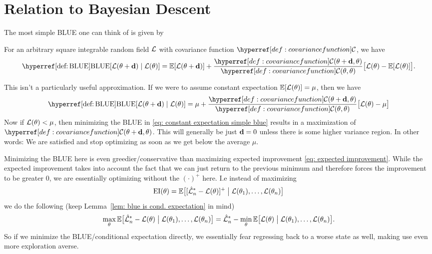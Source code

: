 \section{Relation to Bayesian Descent}

The most simple BLUE one can think of is given by

\begin{lemma}\label{lem: one-step zero-order blue}
	For an arbitrary square integrable random field \(\mathcal{L}\) with covariance
	function \(\C\), we have
	\begin{equation*}
		\BLUE[\Loss(\param + \step) \mid \Loss(\param)]
		= \E[\Loss(\param + \step)]
		+ \frac{\C(\param+\step,\param)}{\C(\param, \param)}
		\big[\Loss(\param) - \E[\Loss(\param)]\big].
	\end{equation*}
\end{lemma}

This isn't a particularly useful approximation. If we were to assume constant
expectation \(\mathbb{E}[\mathcal{L}(\theta)] = \mu\), then we have
\begin{equation}\label{eq: constant expectation simple blue}
	\BLUE[\Loss(\param + \step) \mid \Loss(\param)]
	=\mu 
	+ \frac{\C(\param+\step,\param)}{\C(\param, \param)}
	\big[\Loss(\param) - \mu\big]
\end{equation}
Now if \(\mathcal{L}(\theta) < \mu\), then minimizing the BLUE in
\eqref{eq: constant expectation simple blue} results in a maximization of
\(\C(\param+\step, \param)\). This will generally be just \(\mathbf{d}=0\) unless
there is some higher variance region. In other words: We are satisfied and
stop optimizing as soon as we get below the average \(\mu\).

Minimizing the BLUE here is even greedier/conservative than maximizing
expected improvement \eqref{eq: expected improvement}. While the expected
improvement takes into account the fact that we can just return to the previous
minimum and therefore forces the improvement to be greater \(0\), we are
essentially optimizing without the \((\cdot)^+\) here. I.e instead of
maximizing
\begin{equation*}
	\operatorname{EI}(\theta) = \mathbb{E}\big[
			[\hat{\mathcal{L}}_n^*- \mathcal{L}(\theta)]^+
			\bigm|
			\mathcal{L}(\theta_1),\dots, \mathcal{L}(\theta_n)
		\big]
\end{equation*}
we do the following (keep Lemma~\ref{lem: blue is cond. expectation} in mind)
\begin{equation*}
	\max_{\theta} \mathbb{E}\big[
		\hat{\mathcal{L}}_n^*- \mathcal{L}(\theta)
		\bigm|
		\mathcal{L}(\theta_1),\dots, \mathcal{L}(\theta_n)
	\big]
	= \hat{\mathcal{L}}_n^* - \min_{\theta} \mathbb{E}\big[
		\mathcal{L}(\theta)
		\bigm|
		\mathcal{L}(\theta_1),\dots, \mathcal{L}(\theta_n)
	\big].
\end{equation*}
So if we minimize the BLUE/conditional expectation directly, we essentially fear
regressing back to a worse state as well, making use even more exploration
averse.

